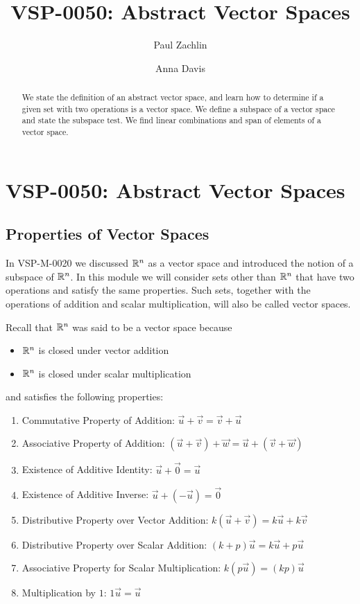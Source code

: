 \documentclass{ximera}
\author{Paul Zachlin \and Anna Davis} \title{VSP-0050: Abstract Vector Spaces} \license{CC-BY 4.0}
\begin{document}
\begin{abstract}
We state the definition of an abstract vector space, and learn how to determine if a given set with two operations is a vector space. We define a subspace of a vector space and state the subspace test.  We find linear combinations and span of elements of a vector space.
\end{abstract}
\maketitle


\section*{VSP-0050: Abstract Vector Spaces}
\subsection*{Properties of Vector Spaces} 

In VSP-M-0020 we discussed $\mathbb{R}^n$ as a vector space and introduced the notion of a subspace of $\mathbb{R}^n$.  
In this module we will consider sets other than $\mathbb{R}^n$ that have two operations and satisfy the same properties.  Such sets, together with the operations of addition and scalar multiplication, will also be called vector spaces.

Recall that $\mathbb{R}^n$ was said to be a vector space because
\begin{itemize}
    \item[] $\mathbb{R}^n$ is closed under vector addition
    \item[] $\mathbb{R}^n$ is closed under scalar multiplication
\end{itemize}
and satisfies the following properties:

  \begin{enumerate}
  \item 
  Commutative Property of Addition:\quad
  $\vec{u}+\vec{v}=\vec{v}+\vec{u}$
  \item 
  Associative Property of Addition:\quad
  $(\vec{u}+\vec{v})+\vec{w}=\vec{u}+(\vec{v}+\vec{w})$
  \item 
  Existence of Additive Identity:\quad
  $\vec{u}+\vec{0}=\vec{u}$
  \item 
  Existence of Additive Inverse:\quad
  $\vec{u}+(-\vec{u})=\vec{0}$
  \item
  Distributive Property over Vector Addition:\quad
  $k(\vec{u}+\vec{v})=k\vec{u}+k\vec{v}$
  \item
  Distributive Property over Scalar Addition:\quad
  $(k+p)\vec{u}=k\vec{u}+p\vec{u}$
  \item 
  Associative Property for Scalar Multiplication:\quad
  $k(p\vec{u})=(kp)\vec{u}$
  \item 
  Multiplication by $1$:\quad
  $1\vec{u}=\vec{u}$
  \end{enumerate}
\end{document}
